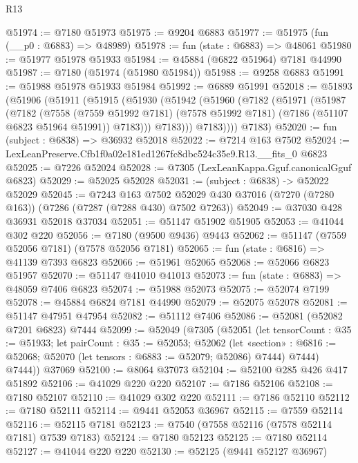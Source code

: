 \begin{lexlean}{R13}
\begin{coremodule}
@51974 := @7180 @51973
@51975 := @9204 @6883
@51977 := @51975 (fun (__p0 : @6883) => @48989)
@51978 := fun (state : @6883) => @48061
@51980 := @51977 @51978 @51933
@51984 := @45884 (@6822 @51964) @7181 @44990
@51987 := @7180 (@51974 (@51980 @51984))
@51988 := @9258 @6883
@51991 := @51988 @51978 @51933 @51984
@51992 := @6889 @51991
@52018 := @51893
    (@51906
      (@51911
        (@51915
          (@51930
            (@51942
              (@51960
                (@7182
                  (@51971
                    (@51987
                      (@7182
                        (@7558
                          (@7559 @51992 @7181)
                          (@7578 @51992 @7181)
                          (@7186 (@51107 @6823 @51964 @51991))
                          @7183)))
                    @7183)))
              @7183))))
      @7183)
@52020 := fun (subject : @6838) => @36932 @52018
@52022 := @7214 @163 @7502
@52024 := LexLeanPreserve.Cfb1f0a02e181ed1267fc8dbc524c35e9.R13.__fits_0 @6823
@52025 := @7226 @52024
@52028 := @7305 (LexLeanKappa.Gguf.canonicalGguf @6823)
@52029 := @52025 @52028
@52031 := (subject : @6838) -> @52022 @52029
@52045 := @7243
    @163
    @7502
    @52029
    @430
    @37016
    (@7270 (@7280 @163))
    (@7286 (@7287 (@7288 @430) @7502 @7263))
@52049 := @37030 @428 @36931 @52018 @37034
@52051 := @51147 @51902 @51905
@52053 := @41044 @302 @220
@52056 := @7180 (@9500 @9436) @9443
@52062 := @51147 (@7559 @52056 @7181) (@7578 @52056 @7181)
@52065 := fun (state : @6816) => @41139 @7393 @6823
@52066 := @51961 @52065
@52068 := @52066 @6823 @51957
@52070 := @51147 @41010 @41013
@52073 := fun (state : @6883) => @48059 @7406 @6823
@52074 := @51988 @52073
@52075 := @52074 @7199
@52078 := @45884 @6824 @7181 @44990
@52079 := @52075 @52078
@52081 := @51147 @47951 @47954
@52082 := @51112 @7406
@52086 := @52081 (@52082 @7201 @6823) @7444
@52099 := @52049
    (@7305
      (@52051
        (let tensorCount : @35 := @51933;
        let pairCount : @35 := @52053;
        @52062
          (let «section» : @6816 := @52068; @52070 (let tensors : @6883 := @52079; @52086) @7444)
          @7444)
        @7444))
    @37069
@52100 := @8064 @37073
@52104 := @52100 @285 @426 @417 @51892
@52106 := @41029 @220 @220
@52107 := @7186 @52106
@52108 := @7180 @52107
@52110 := @41029 @302 @220
@52111 := @7186 @52110
@52112 := @7180 @52111
@52114 := @9441 @52053 @36967
@52115 := @7559 @52114
@52116 := @52115 @7181
@52123 := @7540 (@7558 @52116 (@7578 @52114 @7181) @7539 @7183)
@52124 := @7180 @52123
@52125 := @7180 @52114
@52127 := @41044 @220 @220
@52130 := @52125 (@9441 @52127 @36967)

\end{coremodule}
\end{lexlean}
